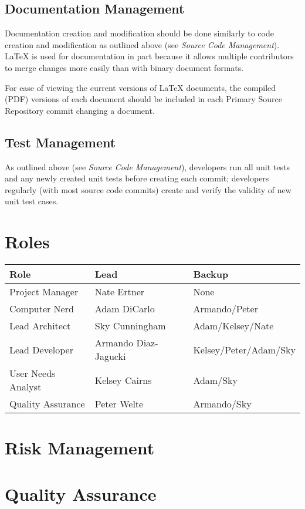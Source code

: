 \documentclass[11pt]{article}
\begin{document}
	\subsection{Documentation Management}
		Documentation creation and modification should be done similarly to code creation and modification as outlined above (see {\em Source Code Management}). LaTeX is used for documentation in part because it allows multiple contributors to merge changes more easily than with binary document formats.

		For ease of viewing the current versions of LaTeX documents, the compiled (PDF) versions of each document should be included in each Primary Source Repository commit changing a document.

	\subsection{Test Management}
		As outlined above (see {\em Source Code Management}), developers run all unit tests and any newly created unit tests before creating each commit; developers regularly (with most source code commits) create and verify the validity of new unit test cases.

\section{Roles}
\begin{tabular}{|l|l|l|}
\hline
\textbf{Role} & \textbf{Lead} & \textbf{Backup}  \\ \hline
Project Manager & Nate Ertner & None\\ \hline
Computer Nerd & Adam DiCarlo  & Armando/Peter\\ \hline
Lead Architect & Sky Cunningham  & Adam/Kelsey/Nate \\ \hline
Lead Developer & Armando Diaz-Jagucki & Kelsey/Peter/Adam/Sky \\ \hline
User Needs Analyst & Kelsey Cairns & Adam/Sky \\ \hline
Quality Assurance & Peter Welte  & Armando/Sky \\ \hline

\end{tabular}


\section{Risk Management}


\section{Quality Assurance}
\end{document}
